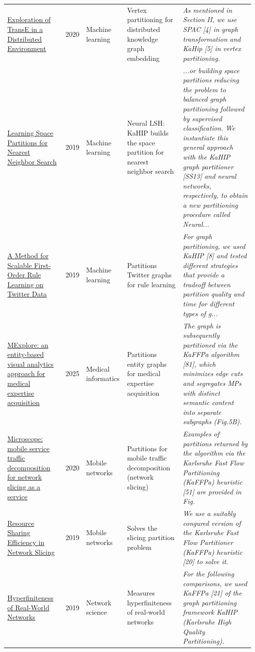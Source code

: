 \documentclass[9pt]{extarticle}
\begin{document}
\begin{longtable}{@{}>{\raggedright}p{6.6cm}r>{\raggedright}p{2.9cm}>{\raggedright}p{4.6cm}>{\raggedright\arraybackslash}p{8.4cm}@{}}
\href{https://doi.org/10.1109/ICDCS47774.2020.00190}{Exploration of TransE in a Distributed Environment} & 2020 & Machine learning & Vertex partitioning for distributed knowledge graph embedding & {\footnotesize\itshape As mentioned in Section II, we use SPAC [4] in graph transformation and KaHip [5] in vertex partitioning.}\\
\href{https://doi.org/10.48550/arxiv.1901.08544}{Learning Space Partitions for Nearest Neighbor Search} & 2019 & Machine learning & Neural LSH: KaHIP builds the space partition for nearest neighbor search & {\footnotesize\itshape ...or building space partitions reducing the problem to balanced graph partitioning followed by supervised classification. We instantiate this general approach with the KaHIP graph partitioner [SS13] and neural networks, respectively, to obtain a new partitioning procedure called Neural...}\\
\href{https://doi.org/10.1109/ICDEW.2019.000-1}{A Method for Scalable First-Order Rule Learning on Twitter Data} & 2019 & Machine learning & Partitions Twitter graphs for rule learning & {\footnotesize\itshape For graph partitioning, we used KaHIP [8] and tested different strategies that provide a tradeoff between partition quality and time for different types of g...}\\
\href{https://doi.org/10.48550/arXiv.2507.12337}{MExplore: an entity-based visual analytics approach for medical expertise acquisition} & 2025 & Medical informatics & Partitions entity graphs for medical expertise acquisition & {\footnotesize\itshape The graph is subsequently partitioned via the KaFFPa algorithm [81], which minimizes edge cuts and segregates MPs with distinct semantic content into separate subgraphs (Fig.5B).}\\
\href{https://doi.org/10.1145/3372224.3419195}{Microscope: mobile service traffic decomposition for network slicing as a service} & 2020 & Mobile networks & Partitions for mobile traffic decomposition (network slicing) & {\footnotesize\itshape Examples of partitions returned by the algorithm via the Karlsruhe Fast Flow Partitioning (KaFFPa) heuristic [51] are provided in Fig.}\\
\href{https://doi.org/10.1109/TNSM.2019.2923265}{Resource Sharing Efficiency in Network Slicing} & 2019 & Mobile networks & Solves the slicing partition problem & {\footnotesize\itshape We use a suitably congured version of the Karlsruhe Fast Flow Partitioner (KaFFPa) heuristic [20] to solve it.}\\
\href{https://doi.org/10.1007/s12626-019-00051-3}{Hyperfiniteness of Real-World Networks} & 2019 & Network science & Measures hyperfiniteness of real-world networks & {\footnotesize\itshape For the following comparisons, we used KaFFPa [21] of the graph partitioning framework KaHIP (Karlsruhe High Quality Partitioning).}\\

\end{longtable}
\end{document}
